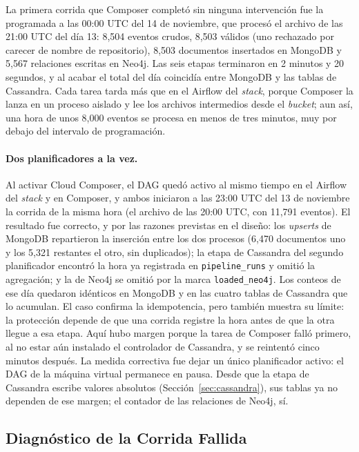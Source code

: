 La primera corrida que Composer completó sin ninguna intervención fue la programada a las 00:00 UTC del 14 de noviembre, que procesó el archivo de las 21:00 UTC del día 13: 8,504 eventos crudos, 8,503 válidos (uno rechazado por carecer de nombre de repositorio), 8,503 documentos insertados en MongoDB y 5,567 relaciones escritas en Neo4j. Las seis etapas terminaron en 2 minutos y 20 segundos, y al acabar el total del día coincidía entre MongoDB y las tablas de Cassandra. Cada tarea tarda más que en el Airflow del \textit{stack}, porque Composer la lanza en un proceso aislado y lee los archivos intermedios desde el \textit{bucket}; aun así, una hora de unos 8,000 eventos se procesa en menos de tres minutos, muy por debajo del intervalo de programación.

\paragraph{Dos planificadores a la vez.} Al activar Cloud Composer, el DAG quedó activo al mismo tiempo en el Airflow del \textit{stack} y en Composer, y ambos iniciaron a las 23:00 UTC del 13 de noviembre la corrida de la misma hora (el archivo de las 20:00 UTC, con 11,791 eventos). El resultado fue correcto, y por las razones previstas en el diseño: los \textit{upserts} de MongoDB repartieron la inserción entre los dos procesos (6,470 documentos uno y los 5,321 restantes el otro, sin duplicados); la etapa de Cassandra del segundo planificador encontró la hora ya registrada en \texttt{pipeline\_runs} y omitió la agregación; y la de Neo4j se omitió por la marca \texttt{loaded\_neo4j}. Los conteos de ese día quedaron idénticos en MongoDB y en las cuatro tablas de Cassandra que lo acumulan. El caso confirma la idempotencia, pero también muestra su límite: la protección depende de que una corrida registre la hora antes de que la otra llegue a esa etapa. Aquí hubo margen porque la tarea de Composer falló primero, al no estar aún instalado el controlador de Cassandra, y se reintentó cinco minutos después. La medida correctiva fue dejar un único planificador activo: el DAG de la máquina virtual permanece en pausa. Desde que la etapa de Cassandra escribe valores absolutos (Sección~\ref{sec:cassandra}), sus tablas ya no dependen de ese margen; el contador de las relaciones de Neo4j, sí.

\subsection{Diagnóstico de la Corrida Fallida}
\label{subsec:fallo}

